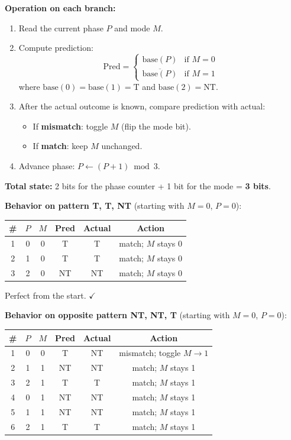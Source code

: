 \textbf{Operation on each branch:}
\begin{enumerate}
  \item Read the current phase $P$ and mode $M$.
  \item Compute prediction:
    \[
      \text{Pred} =
      \begin{cases}
        \text{base}(P) & \text{if } M = 0 \\
        \overline{\text{base}(P)} & \text{if } M = 1
      \end{cases}
    \]
    where $\text{base}(0) = \text{base}(1) = \text{T}$ and
    $\text{base}(2) = \text{NT}$.
  \item After the actual outcome is known, compare prediction with actual:
    \begin{itemize}
      \item If \textbf{mismatch}: toggle $M$ (flip the mode bit).
      \item If \textbf{match}: keep $M$ unchanged.
    \end{itemize}
  \item Advance phase: $P \leftarrow (P + 1) \bmod 3$.
\end{enumerate}

\textbf{Total state:} 2 bits for the phase counter + 1 bit for the mode
= \textbf{3 bits}.

\textbf{Behavior on pattern T, T, NT} (starting with $M = 0$, $P = 0$):

\begin{center}
\begin{tabular}{cccccc}
\toprule
\textbf{\#} & $P$ & $M$ & \textbf{Pred} & \textbf{Actual} &
  \textbf{Action} \\
\midrule
1 & 0 & 0 & T  & T  & match; $M$ stays 0 \\
2 & 1 & 0 & T  & T  & match; $M$ stays 0 \\
3 & 2 & 0 & NT & NT & match; $M$ stays 0 \\
\bottomrule
\end{tabular}
\end{center}

Perfect from the start. $\checkmark$

\textbf{Behavior on opposite pattern NT, NT, T} (starting with $M = 0$, $P = 0$):

\begin{center}
\begin{tabular}{cccccc}
\toprule
\textbf{\#} & $P$ & $M$ & \textbf{Pred} & \textbf{Actual} &
  \textbf{Action} \\
\midrule
1 & 0 & 0 & T  & NT & mismatch; toggle $M \to 1$ \\
2 & 1 & 1 & NT & NT & match; $M$ stays 1 \\
3 & 2 & 1 & T  & T  & match; $M$ stays 1 \\
4 & 0 & 1 & NT & NT & match; $M$ stays 1 \\
5 & 1 & 1 & NT & NT & match; $M$ stays 1 \\
6 & 2 & 1 & T  & T  & match; $M$ stays 1 \\
\bottomrule
\end{tabular}
\end{center}

